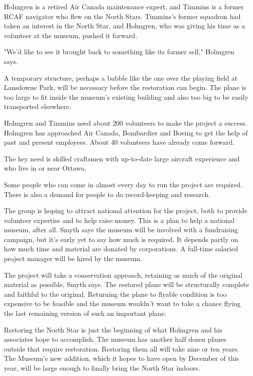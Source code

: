 \begin{multicols}{2}
Holmgren is a retired Air Canada maintenance expert, and Timmins is a former
RCAF navigator who flew on the North Stars. Timmins's former squadron had taken
an interest in the North Star, and Holmgren, who was giving his time as a
volunteer at the museum, pushed it forward.

"We'd like to see it brought back to something like its former self," Holmgren
says.

A temporary structure, perhaps a bubble like the one over the playing field at
Lansdowne Park, will be necessary before the restoration can begin. The plane
is too large to fit inside the museum's existing building and also too big to
be easily transported elsewhere.

Holmgren and Timmins need about 200 volunteers to make the project a success.
Holmgren has approached Air Canada, Bombardier and Boeing to get the help of
past and present employees. About 40 volunteers have already come forward.

The key need is skilled craftsmen with up-to-date large aircraft experience and
who live in or near Ottawa.

Some people who can come in almost every day to run the project are required. 
There is also a demand for people to do record-keeping and research.

The group is hoping to attract national attention for the project, both to
provide volunteer expertise and to help raise money.  This is a plan to help a
national museum, after all.  Smyth says the museum will be involved with a
fundraising campaign, but it's early yet to say how much is required. It
depends partly on how much time and material are donated by corporations. A
full-time salaried project manager will be hired by the museum.

The project will take a conservation approach, retaining as much of the
original material as possible, Smyth says. The restored plane will be
structurally complete and faithful to the original. Returning the plane to
flyable condition is too expensive to be feasible and the museum wouldn't want
to take a chance flying the last remaining version of such an important plane.

Restoring the North Star is just the beginning of what Holmgren and his
associates hope to accomplish. The museum has another half dozen planes outside
that require restoration. Restoring them all will take nine or ten years. The
Museum's new addition, which it hopes to have open by December of this year,
will be large enough to finally bring the North Star indoors.


\end{multicols}
